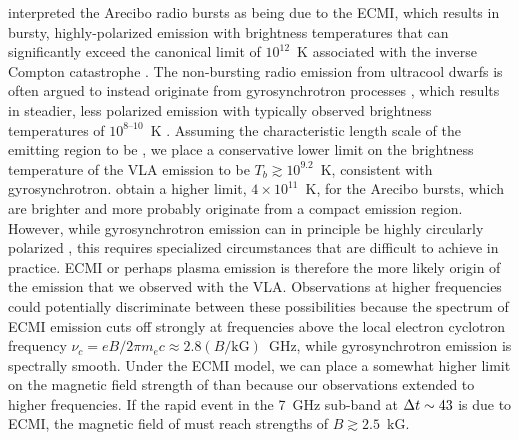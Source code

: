 \documentclass[twocolumn, times]{aastex6}
\begin{document}
\citet{rw16} interpreted the Arecibo radio bursts as being due to the ECMI,
which results in bursty, highly-polarized emission with brightness
temperatures that can significantly exceed the canonical limit of $10^{12}$~K
associated with the inverse Compton catastrophe \citep{kpt69}. The
non-bursting radio emission from ultracool dwarfs is often argued to instead
originate from gyrosynchrotron processes , which results in
steadier, less polarized emission with typically observed brightness
temperatures of \apx$10^{8\text{--}10}$~K . Assuming the
characteristic length scale of the emitting region to be \rjup, we place a
conservative lower limit on the brightness temperature of the VLA emission to
be $T_b \gtrsim 10^{9.2}$~K, consistent with gyrosynchrotron. \citet{rw16}
obtain a higher limit, $4 \times 10^{11}$~K, for the Arecibo bursts, which are
brighter and more probably originate from a compact emission region. However,
while gyrosynchrotron emission can in principle be highly circularly polarized
\citep{d85}, this requires specialized circumstances that are difficult to
achieve in practice. ECMI or perhaps plasma emission is therefore the more
likely origin of the emission that we observed with the VLA. Observations at
higher frequencies could potentially discriminate between these possibilities
because the spectrum of ECMI emission cuts off strongly at frequencies above
the local electron cyclotron frequency $\nu_c = e B / 2 \pi m_e c \approx 2.8
(B / \text{kG})$~GHz, while gyrosynchrotron emission is spectrally smooth.
Under the ECMI model, we can place a somewhat higher limit on the magnetic
field strength of  than \citet{rw16} because our observations
extended to higher frequencies. If the rapid event in the 7~GHz sub-band at
${\Delta t} \sim 43$ is due to ECMI, the magnetic field of  must reach
strengths of $B \gtrsim 2.5$~kG.
\end{document}
